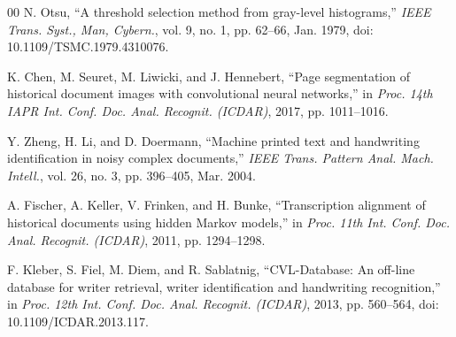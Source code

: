 \documentclass{IEEEtran}
\begin{document}
\begin{thebibliography}{00}
 N. Otsu, ``A threshold selection method from gray-level histograms,'' \emph{IEEE Trans. Syst., Man, Cybern.}, vol. 9, no. 1, pp. 62--66, Jan. 1979, doi: 10.1109/TSMC.1979.4310076.

 K. Chen, M. Seuret, M. Liwicki, and J. Hennebert, ``Page segmentation of historical document images with convolutional neural networks,'' in \emph{Proc. 14th IAPR Int. Conf. Doc. Anal. Recognit. (ICDAR)}, 2017, pp. 1011--1016.

 Y. Zheng, H. Li, and D. Doermann, ``Machine printed text and handwriting identification in noisy complex documents,'' \emph{IEEE Trans. Pattern Anal. Mach. Intell.}, vol. 26, no. 3, pp. 396--405, Mar. 2004.

 A. Fischer, A. Keller, V. Frinken, and H. Bunke, ``Transcription alignment of historical documents using hidden Markov models,'' in \emph{Proc. 11th Int. Conf. Doc. Anal. Recognit. (ICDAR)}, 2011, pp. 1294--1298.

 F. Kleber, S. Fiel, M. Diem, and R. Sablatnig, ``CVL-Database: An off-line database for writer retrieval, writer identification and handwriting recognition,'' in \emph{Proc. 12th Int. Conf. Doc. Anal. Recognit. (ICDAR)}, 2013, pp. 560--564, doi: 10.1109/ICDAR.2013.117.

\end{thebibliography}
\end{document}
